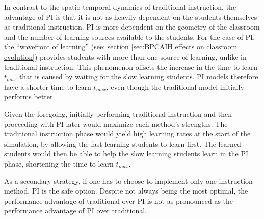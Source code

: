In contrast to the spatio-temporal dynamics of traditional instruction, the advantage of PI is that it is not as heavily dependent on the students themselves as traditional instruction.
PI is more dependent on the geometry of the classroom and the number of learning sources available to the students.
For the case of PI, the ``wavefront of learning'' (see: section \ref{sec:BPCAIH effects on classroom evolution}) provides students with more than one source of learning, unlike in traditional instruction. 
This phenomenon offsets the increase in the time to learn $t_{max}$ that is caused by waiting for the slow learning students.
PI models therefore have a shorter time to learn $t_{max}$, even though the traditional model initially performs better.

Given the foregoing, initially performing traditional instruction and then proceeding with PI later would maximize each method's strengths. 
The traditional instruction phase would yield high learning rates at the start of the simulation, by allowing the fast learning students to learn first.
The learned students would then be able to help the slow learning students learn in the PI phase, shortening the time to learn $t_{max}$.

As a secondary strategy, if one has to choose to implement only one instruction method, PI is the safe option. Despite not always being the most optimal, the performance advantage of traditional over PI is not as pronounced as the performance advantage of PI over traditional.

